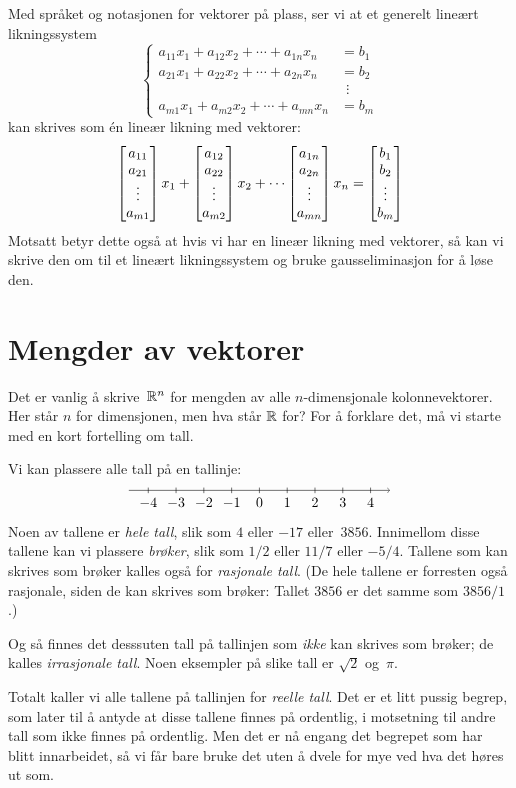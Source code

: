 \smallskip%
Med språket og notasjonen for vektorer på plass, ser vi at
et generelt lineært likningssystem
\[
\left\{
\begin{aligned}
  a_{11} x_1 + a_{12} x_2 + \cdots + a_{1n} x_n &= b_1 \\
  a_{21} x_1 + a_{22} x_2 + \cdots + a_{2n} x_n &= b_2 \\
                                                &\ \ \vdots \\
  a_{m1} x_1 + a_{m2} x_2 + \cdots + a_{mn} x_n &= b_m
\end{aligned}
\right.
\]
kan skrives som én lineær likning med vektorer:
\[
\begin{bmatrix} a_{11} \\ a_{21} \\ \vdots \\ a_{m1} \end{bmatrix} x_1 +
\begin{bmatrix} a_{12} \\ a_{22} \\ \vdots \\ a_{m2} \end{bmatrix} x_2 +
\cdots
\begin{bmatrix} a_{1n} \\ a_{2n} \\ \vdots \\ a_{mn} \end{bmatrix} x_n
=
\begin{bmatrix} b_1 \\ b_2 \\ \vdots \\ b_m \end{bmatrix}
\]
Motsatt betyr dette også at hvis vi har en lineær likning med
vektorer, så kan vi skrive den om til et lineært likningssystem og
bruke gausseliminasjon for å løse den.


\section*{Mengder av vektorer}

Det er vanlig å skrive~$\mathbb{R}^n$ for mengden av alle $n$-dimensjonale
kolonnevektorer.  Her står $n$ for dimensjonen, men hva står $\mathbb{R}$ for?
For å forklare det, må vi starte med en kort fortelling om tall.

Vi kan plassere alle tall på en tallinje:
\[
\begin{tikzpicture}[scale=.7]
\draw[->] (-4.7,0) -- (4.7,0);
\foreach \x in {-4,...,4}
\draw (\x,.1) -- (\x,-.1) node[anchor=north] {$\x$};
\end{tikzpicture}
\]
Noen av tallene er \emph{hele tall}, slik som $4$ eller $-17$
eller~$3856$.  Innimellom disse tallene kan vi plassere \emph{brøker},
slik som $1/2$ eller $11/7$ eller $-5/4$.  Tallene som kan skrives som
brøker kalles også for \emph{rasjonale tall}.  (De hele tallene er
forresten også rasjonale, siden de kan skrives som brøker: Tallet
$3856$ er det samme som $3856/1$.)

Og så finnes det
desssuten tall på tallinjen som \emph{ikke} kan skrives som brøker; de
kalles \emph{irrasjonale tall}.  Noen eksempler på slike tall er
$\sqrt{2}$ og~$\pi$.

Totalt kaller vi alle tallene på tallinjen for \emph{reelle tall}.
Det er et litt pussig begrep, som later til å antyde at disse tallene
finnes på ordentlig, i motsetning til andre tall som ikke finnes på
ordentlig.  Men det er nå engang det begrepet som har blitt
innarbeidet, så vi får bare bruke det uten å dvele for mye ved hva det
høres ut som.

